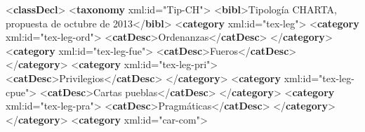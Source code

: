 \documentclass[
]{book}
\newenvironment{Shaded}{\begin{snugshade}}{\end{snugshade}}
\newcommand{\KeywordTok}[1]{\textcolor[rgb]{0.13,0.29,0.53}{\textbf{#1}}}
\newcommand{\NormalTok}[1]{#1}
\newcommand{\OtherTok}[1]{\textcolor[rgb]{0.56,0.35,0.01}{#1}}
\newcommand{\StringTok}[1]{\textcolor[rgb]{0.31,0.60,0.02}{#1}}
\begin{document}
\begin{Shaded}
\begin{Highlighting}[]
\NormalTok{\textless{}}\KeywordTok{classDecl}\NormalTok{\textgreater{} }
\NormalTok{    \textless{}}\KeywordTok{taxonomy}\OtherTok{ xml:id=}\StringTok{"Tip{-}CH"}\NormalTok{\textgreater{}}
\NormalTok{       \textless{}}\KeywordTok{bibl}\NormalTok{\textgreater{}Tipología CHARTA, propuesta de octubre de 2013\textless{}/}\KeywordTok{bibl}\NormalTok{\textgreater{} }
\NormalTok{       \textless{}}\KeywordTok{category}\OtherTok{ xml:id=}\StringTok{"tex{-}leg"}\NormalTok{\textgreater{} }
\NormalTok{          \textless{}}\KeywordTok{category}\OtherTok{ xml:id=}\StringTok{"tex{-}leg{-}ord"}\NormalTok{\textgreater{}}
\NormalTok{             \textless{}}\KeywordTok{catDesc}\NormalTok{\textgreater{}Ordenanzas\textless{}/}\KeywordTok{catDesc}\NormalTok{\textgreater{}}
\NormalTok{          \textless{}/}\KeywordTok{category}\NormalTok{\textgreater{}}
\NormalTok{          \textless{}}\KeywordTok{category}\OtherTok{ xml:id=}\StringTok{"tex{-}leg{-}fue"}\NormalTok{\textgreater{}}
\NormalTok{             \textless{}}\KeywordTok{catDesc}\NormalTok{\textgreater{}Fueros\textless{}/}\KeywordTok{catDesc}\NormalTok{\textgreater{}}
\NormalTok{          \textless{}/}\KeywordTok{category}\NormalTok{\textgreater{}}
\NormalTok{          \textless{}}\KeywordTok{category}\OtherTok{ xml:id=}\StringTok{"tex{-}leg{-}pri"}\NormalTok{\textgreater{}}
\NormalTok{             \textless{}}\KeywordTok{catDesc}\NormalTok{\textgreater{}Privilegios\textless{}/}\KeywordTok{catDesc}\NormalTok{\textgreater{}}
\NormalTok{          \textless{}/}\KeywordTok{category}\NormalTok{\textgreater{}}
\NormalTok{          \textless{}}\KeywordTok{category}\OtherTok{ xml:id=}\StringTok{"tex{-}leg{-}cpue"}\NormalTok{\textgreater{}}
\NormalTok{             \textless{}}\KeywordTok{catDesc}\NormalTok{\textgreater{}Cartas pueblas\textless{}/}\KeywordTok{catDesc}\NormalTok{\textgreater{}}
\NormalTok{          \textless{}/}\KeywordTok{category}\NormalTok{\textgreater{}}
\NormalTok{          \textless{}}\KeywordTok{category}\OtherTok{ xml:id=}\StringTok{"tex{-}leg{-}pra"}\NormalTok{\textgreater{}}
\NormalTok{             \textless{}}\KeywordTok{catDesc}\NormalTok{\textgreater{}Pragmáticas\textless{}/}\KeywordTok{catDesc}\NormalTok{\textgreater{}}
\NormalTok{          \textless{}/}\KeywordTok{category}\NormalTok{\textgreater{}}
\NormalTok{       \textless{}/}\KeywordTok{category}\NormalTok{\textgreater{}}
\NormalTok{       \textless{}}\KeywordTok{category}\OtherTok{ xml:id=}\StringTok{"car{-}com"}\NormalTok{\textgreater{} }

\end{Highlighting}
\end{Shaded}
\end{document}
